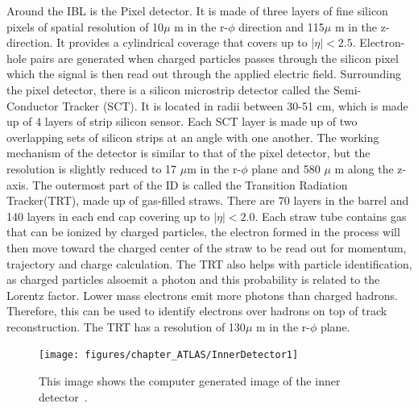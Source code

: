 Around the IBL is the Pixel detector. It is made of three layers of fine silicon pixels of spatial resolution of 10$\mu$ m in the r-$\phi$ direction and 115$\mu$ m in the z-direction. It provides a cylindrical coverage that covers up to $|\eta|<2.5$. Electron-hole pairs are generated when charged particles passes through the silicon pixel which the signal is then read out through the applied electric field.
Surrounding the pixel detector, there is a silicon microstrip detector called the Semi-Conductor Tracker (SCT). It is located in radii between 30-51 cm, which is made up of 4 layers of strip silicon sensor. Each SCT layer is made up of two overlapping sets of silicon strips at an angle with one another. The working mechanism of the detector is similar to that of the pixel detector, but the resolution is slightly reduced to 17 $\mu$m in the r-$\phi$ plane and 580 $\mu$ m along the z-axis. 
The outermost part of the ID is called the Transition Radiation Tracker(TRT), made up of gas-filled straws. There are 70 layers in the barrel and 140 layers in each end cap covering up to $|\eta|<2.0$. Each straw tube contains gas that can be ionized by charged particles, the electron formed in the process will then move toward the charged center of the straw to be read out for momentum, trajectory and charge calculation. The TRT also helps with particle identification, as charged particles alsoemit a photon and this probability is related to the Lorentz factor. Lower mass electrons emit more photons than charged hadrons. Therefore, this can be used to identify electrons over hadrons on top of track reconstruction. The TRT has a resolution of 130$\mu$ m in the r-$\phi$ plane.

\begin{figure}[!htb]
    \begin{center}
        \texttt{[image: figures/chapter\_ATLAS/InnerDetector1]}
        \caption{
            This image shows the computer generated image of the inner detector~\cite{Pequenao:1095926}.
        }
        \label{fig:InnerDetector}
    \end{center}
\end{figure}

